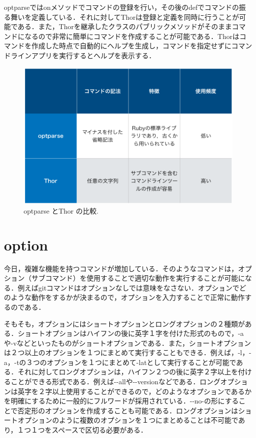 optparseではonメソッドでコマンドの登録を行い，その後のdefでコマンドの振る舞いを定義している．それに対してThorは登録と定義を同時に行うことが可能である．また，Thorを継承したクラスのパブリックメソッドがそのままコマンドになるので非常に簡単にコマンドを作成することが可能である．Thorはコマンドを作成した時点で自動的にヘルプを生成し，コマンドを指定せずにコマンドラインアプリを実行するとヘルプを表示する．

\begin{figure}[H]
\centering
\begin{center}
\includegraphics[width=150mm]{../.././figs/opt_thor.png}
\end{center}
\caption{optparse とThor の比較. \label{opt_thor}}

\label{fig:This}
\end{figure}

    \section{option}\label{option}

今日，複雑な機能を持つコマンドが増加している．そのようなコマンドは，オプション（サブコマンド）を使用することで適切な動作を実行することが可能になる．例えばgitコマンドはオプションなしでは意味をなさない．オプションでどのような動作をするかが決まるので，オプションを入力することで正常に動作するのである．

そもそも，オプションにはショートオプションとロングオプションの２種類がある．ショートオプションはハイフンの後に英字１字を付けた形式のもので，-aや-vなどといったものがショートオプションである．また，ショートオプションは２つ以上のオプションを１つにまとめて実行することもできる．例えば，-l，-a，-tの３つのオプションを１つにまとめて-latとして実行することが可能である．それに対してロングオプションは，ハイフン２つの後に英字２字以上を付けることができる形式である．例えば-\/-allや-\/-versionなどである．ロングオプションは英字を２字以上使用することができるので，どのようなオプションであるかを明確にするために一般的にフルワードが採用されている．-\/-no-の形にすることで否定形のオプションを作成することも可能である．ロングオプションはショートオプションのように複数のオプションを１つにまとめることは不可能であり，１つ１つをスペースで区切る必要がある．

